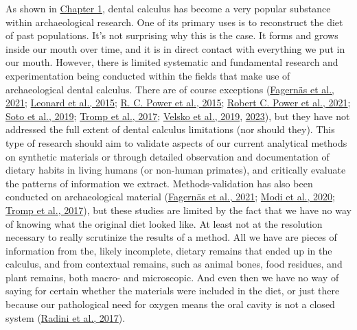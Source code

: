 \documentclass[
  letterpaper,
]{book}
\begin{document}
As shown in \protect\hyperlink{fig-plot-and-wordclouds}{Chapter 1},
dental calculus has become a very popular substance within
archaeological research. One of its primary uses is to reconstruct the
diet of past populations. It's not surprising why this is the case. It
forms and grows inside our mouth over time, and it is in direct contact
with everything we put in our mouth. However, there is limited
systematic and fundamental research and experimentation being conducted
within the fields that make use of archaeological dental calculus. There
are of course exceptions
(\protect\hyperlink{ref-fagernasMicrobialBiogeography2021}{Fagernäs et
al., 2021}; \protect\hyperlink{ref-leonardPlantMicroremains2015}{Leonard
et al., 2015}; \protect\hyperlink{ref-powerChimpCalculus2015}{R. C.
Power et al., 2015};
\protect\hyperlink{ref-powerRepresentativenessDental2021}{Robert C.
Power et al., 2021};
\protect\hyperlink{ref-sotoCharacterizationDecontamination2019}{Soto et
al., 2019}; \protect\hyperlink{ref-trompEDTACalculus2017}{Tromp et al.,
2017}; \protect\hyperlink{ref-velskoMicrobialDifferences2019}{Velsko et
al., 2019}, \protect\hyperlink{ref-velskoHighConservation2023}{2023}),
but they have not addressed the full extent of dental calculus
limitations (nor should they). This type of research should aim to
validate aspects of our current analytical methods on synthetic
materials or through detailed observation and documentation of dietary
habits in living humans (or non-human primates), and critically evaluate
the patterns of information we extract. Methods-validation has also been
conducted on archaeological material
(\protect\hyperlink{ref-fagernasMicrobialBiogeography2021}{Fagernäs et
al., 2021}; \protect\hyperlink{ref-modiCalculusMethodologies2020}{Modi
et al., 2020}; \protect\hyperlink{ref-trompEDTACalculus2017}{Tromp et
al., 2017}), but these studies are limited by the fact that we have no
way of knowing what the original diet looked like. At least not at the
resolution necessary to really scrutinize the results of a method. All
we have are pieces of information from the, likely incomplete, dietary
remains that ended up in the calculus, and from contextual remains, such
as animal bones, food residues, and plant remains, both macro- and
microscopic. And even then we have no way of saying for certain whether
the materials were included in the diet, or just there because our
pathological need for oxygen means the oral cavity is not a closed
system (\protect\hyperlink{ref-radiniFoodPathways2017}{Radini et al.,
2017}).
\end{document}
